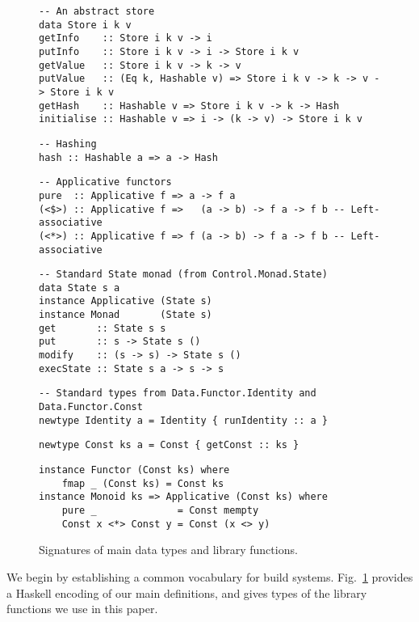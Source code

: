 \begin{figure}
\begin{verbatim}
-- An abstract store
data Store i k v
getInfo    :: Store i k v -> i
putInfo    :: Store i k v -> i -> Store i k v
getValue   :: Store i k v -> k -> v
putValue   :: (Eq k, Hashable v) => Store i k v -> k -> v -> Store i k v
getHash    :: Hashable v => Store i k v -> k -> Hash
initialise :: Hashable v => i -> (k -> v) -> Store i k v
\end{verbatim}
\vspace{1mm}
\begin{verbatim}
-- Hashing
hash :: Hashable a => a -> Hash
\end{verbatim}
\vspace{1mm}
\begin{verbatim}
-- Applicative functors
pure  :: Applicative f => a -> f a
(<$>) :: Applicative f =>   (a -> b) -> f a -> f b -- Left-associative
(<*>) :: Applicative f => f (a -> b) -> f a -> f b -- Left-associative
\end{verbatim}
\vspace{1mm}
\begin{verbatim}
-- Standard State monad (from Control.Monad.State)
data State s a
instance Applicative (State s)
instance Monad       (State s)
get       :: State s s
put       :: s -> State s ()
modify    :: (s -> s) -> State s ()
execState :: State s a -> s -> s
\end{verbatim}
\vspace{1mm}
\begin{verbatim}
-- Standard types from Data.Functor.Identity and Data.Functor.Const
newtype Identity a = Identity { runIdentity :: a }
\end{verbatim}
\begin{verbatim}
newtype Const ks a = Const { getConst :: ks }
\end{verbatim}
\vspace{0.5mm}
\begin{verbatim}
instance Functor (Const ks) where
    fmap _ (Const ks) = Const ks
instance Monoid ks => Applicative (Const ks) where
    pure _              = Const mempty
    Const x <*> Const y = Const (x <> y)
\end{verbatim}
\vspace{-2mm}
\caption{Signatures of main data types and library functions.}\label{fig-types}
\vspace{-4mm}
\end{figure}
We begin by establishing a common vocabulary for build systems.
Fig.~\ref{fig-types} provides a Haskell encoding of our main definitions,
and gives types of the library functions we use in this paper.

